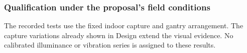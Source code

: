 \subsubsection{Qualification under the proposal's field conditions}
\label{sec:res-conditions}
The recorded tests use the fixed indoor capture and gantry arrangement. The capture variations already shown in Design extend the visual evidence. No calibrated illuminance or vibration series is assigned to these results.
\FloatBarrier

\endgroup
